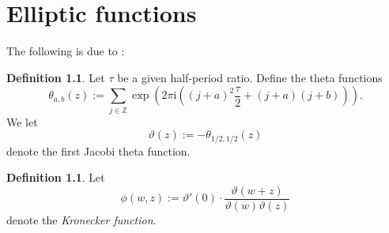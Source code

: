 \documentclass[11pt]{report}
\theoremstyle{definition}
\newtheorem{definition}[theorem]{Definition}
\theoremstyle{remark}
\theoremstyle{remark}
\newcommand{\Z}{\mathbb{Z}}
\newcommand{\R}{\mathbb{R}}
\newcommand{\C}{\mathbb{C}}
\newcommand{\I}{\mathrm{i}}
\begin{document}
%
%
%

\chapter{Elliptic functions}\label{appendix:moduliSpaces}

The following is due to \cite{article:zabrodin:2022}:

\begin{definition}
Let $\tau$ be a given half-period ratio. Define the theta functions
\begin{equation*}
\theta_{a,b}(z) := \sum_{j \in \Z} \exp(2 \pi \I ((j+a)^2 \frac{\tau}{2} + (j+a)(j+b))).
\end{equation*}
We let
\begin{equation*}
\vartheta(z) := -\theta_{1/2,1/2}(z)
\end{equation*}
denote the first Jacobi theta function.
\end{definition}

\begin{definition}
Let
\begin{equation*}
\phi(w,z) := \vartheta'(0) \cdot \frac{\vartheta(w+z)}{\vartheta(w)\vartheta(z)}
\end{equation*}
denote the \emph{Kronecker function}.
\end{definition}
\end{document}
